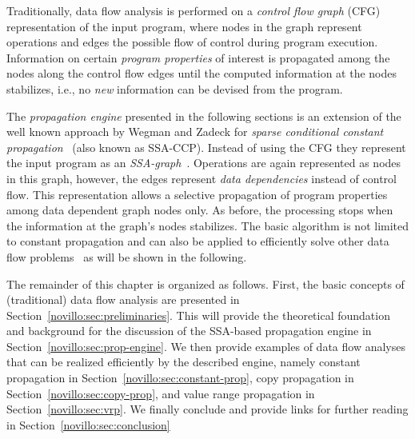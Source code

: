 Traditionally, data flow analysis is performed on a \emph{control flow graph}
(CFG) representation of the input program, where nodes in the graph represent
operations and edges the possible flow of control during program execution.
Information on certain \emph{program properties} of interest is propagated among
the nodes along the control flow edges until the computed information at the
nodes stabilizes, i.e., no \emph{new} information can be devised from the
program.

The \emph{propagation engine} presented in the following sections is an
extension of the well known approach by Wegman and Zadeck for \emph{sparse
conditional constant propagation}~\cite{bib:wegman.ea-91} (also known as
SSA-CCP). Instead of using the CFG they represent the input program as an
\emph{SSA-graph}~\cite{novillo:bib:CFRWZ91}. Operations are again represented as
nodes in this graph, however, the edges represent \emph{data dependencies}
instead of control flow. This representation allows a selective propagation of
program properties among data dependent graph nodes only. As before, the
processing stops when the information at the graph's nodes stabilizes. The basic
algorithm is not limited to constant propagation and can also be applied to
efficiently solve other data flow problems~\cite{novillo:bib:N05} as will be
shown in the following.

The remainder of this chapter is organized as follows. First, the basic concepts
of (traditional) data flow analysis are presented in
Section~\ref{novillo:sec:preliminaries}. This will provide the theoretical
foundation and background for the discussion of the SSA-based propagation
engine in Section~\ref{novillo:sec:prop-engine}. We then provide examples of
data flow analyses that can be realized efficiently by the described engine,
namely constant propagation in Section~\ref{novillo:sec:constant-prop}, copy
propagation in Section~\ref{novillo:sec:copy-prop}, and value range propagation
in Section~\ref{novillo:sec:vrp}. We finally conclude and provide links for
further reading in Section~\ref{novillo:sec:conclusion}

